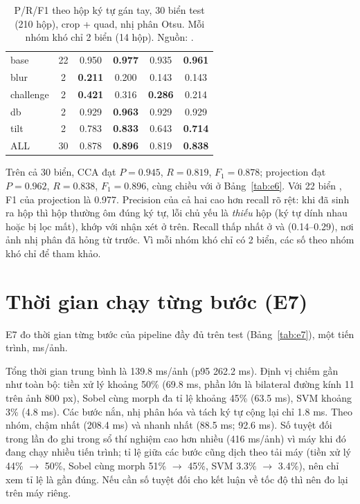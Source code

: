 \begin{table}[htbp]
\centering
\caption[P/R/F1 theo hộp ký tự gán tay (test)]{P/R/F1 theo hộp ký tự gán tay, 30 biển test (210 hộp), crop  + quad, nhị phân Otsu. Mỗi nhóm khó chỉ 2 biển (14 hộp). Nguồn: .}
\label{tab:charprf}
\small
{}
\begin{tabularx}{\textwidth}{lcCCCC}
\hline
{}  &  &  &  &  &  \\
\hline
base & 22 & 0.950 & \textbf{0.977} & 0.935 & \textbf{0.961} \\
blur & 2 & \textbf{0.211} & 0.200 & 0.143 & 0.143 \\
challenge & 2 & \textbf{0.421} & 0.316 & \textbf{0.286} & 0.214 \\
db & 2 & 0.929 & \textbf{0.963} & 0.929 & 0.929 \\
tilt & 2 & 0.783 & \textbf{0.833} & 0.643 & \textbf{0.714} \\
\hline
ALL & 30 & 0.878 & \textbf{0.896} & 0.819 & \textbf{0.838} \\
\hline
\end{tabularx}
\end{table}

Trên cả 30 biển, CCA đạt $P=0.945$, $R=0.819$, $F_1=0.878$; projection đạt $P=0.962$, $R=0.838$, $F_1=0.896$, cùng chiều với  ở Bảng~\ref{tab:e6}. Với 22 biển , F1 của projection là 0.977. Precision của cả hai cao hơn recall rõ rệt: khi đã sinh ra hộp thì hộp thường ôm đúng ký tự, lỗi chủ yếu là \emph{thiếu} hộp (ký tự dính nhau hoặc bị lọc mất), khớp với nhận xét ở trên. Recall thấp nhất ở  và  (0.14--0.29), nơi ảnh nhị phân đã hỏng từ trước. Vì mỗi nhóm khó chỉ có 2 biển, các số theo nhóm khó chỉ để tham khảo.

\section{Thời gian chạy từng bước (E7)}
\label{sec:e7}

E7 đo thời gian từng bước của pipeline đầy đủ trên test (Bảng~\ref{tab:e7}), một tiến trình, ms/ảnh.



Tổng thời gian trung bình là 139.8 ms/ảnh (p95 262.2 ms). Định vị chiếm gần như toàn bộ: tiền xử lý khoảng 50\% (69.8 ms, phần lớn là bilateral đường kính 11 trên ảnh 800 px), Sobel cùng morph đa tỉ lệ khoảng 45\% (63.5 ms), SVM khoảng 3\% (4.8 ms). Các bước nắn, nhị phân hóa và tách ký tự cộng lại chỉ 1.8 ms. Theo nhóm,  chậm nhất (208.4 ms) và  nhanh nhất (88.5 ms;  92.6 ms). Số tuyệt đối trong lần đo ghi trong sổ thí nghiệm cao hơn nhiều (416 ms/ảnh) vì máy khi đó đang chạy nhiều tiến trình; tỉ lệ giữa các bước cũng dịch theo tải máy (tiền xử lý 44\% $\to$ 50\%, Sobel cùng morph 51\% $\to$ 45\%, SVM 3.3\% $\to$ 3.4\%), nên chỉ xem tỉ lệ là gần đúng. Nếu cần số tuyệt đối cho kết luận về tốc độ thì nên đo lại trên máy riêng.


